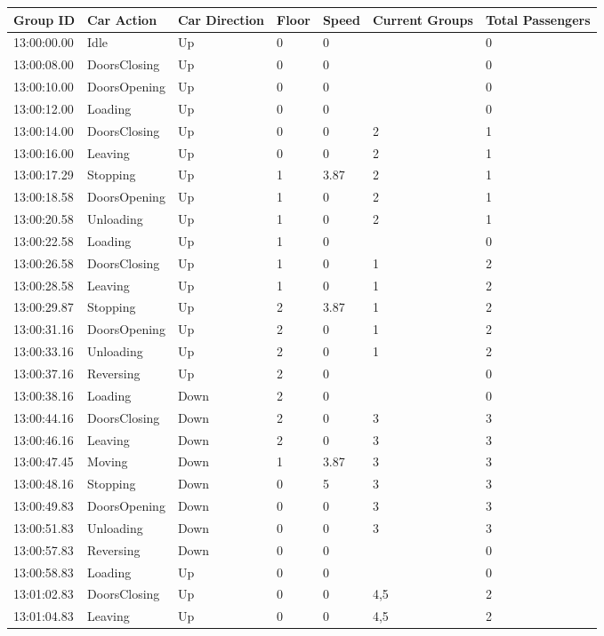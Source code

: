 \documentclass{UoYCSproject}
\begin{document}
\begin{appendices}
\begin{longtable}{l | l | l | l | l | l | l}
	Group ID & Car Action & Car Direction & Floor & Speed & Current Groups & Total Passengers \\
	\hline
	13:00:00.00 & Idle & Up & 0 & 0 &  & 0 \\
	13:00:08.00 & DoorsClosing & Up & 0 & 0 &  & 0 \\
	13:00:10.00 & DoorsOpening & Up & 0 & 0 &  & 0 \\
	13:00:12.00 & Loading & Up & 0 & 0 &  & 0 \\
	13:00:14.00 & DoorsClosing & Up & 0 & 0 & 2 & 1 \\
	13:00:16.00 & Leaving & Up & 0 & 0 & 2 & 1 \\
	13:00:17.29 & Stopping & Up & 1 & 3.87 & 2 & 1 \\
	13:00:18.58 & DoorsOpening & Up & 1 & 0 & 2 & 1 \\
	13:00:20.58 & Unloading & Up & 1 & 0 & 2 & 1 \\
	13:00:22.58 & Loading & Up & 1 & 0 &  & 0 \\
	13:00:26.58 & DoorsClosing & Up & 1 & 0 & 1 & 2 \\
	13:00:28.58 & Leaving & Up & 1 & 0 & 1 & 2 \\
	13:00:29.87 & Stopping & Up & 2 & 3.87 & 1 & 2 \\
	13:00:31.16 & DoorsOpening & Up & 2 & 0 & 1 & 2 \\
	13:00:33.16 & Unloading & Up & 2 & 0 & 1 & 2 \\
	13:00:37.16 & Reversing & Up & 2 & 0 &  & 0 \\
	13:00:38.16 & Loading & Down & 2 & 0 &  & 0 \\
	13:00:44.16 & DoorsClosing & Down & 2 & 0 & 3 & 3 \\
	13:00:46.16 & Leaving & Down & 2 & 0 & 3 & 3 \\
	13:00:47.45 & Moving & Down & 1 & 3.87 & 3 & 3 \\
	13:00:48.16 & Stopping & Down & 0 & 5 & 3 & 3 \\
	13:00:49.83 & DoorsOpening & Down & 0 & 0 & 3 & 3 \\
	13:00:51.83 & Unloading & Down & 0 & 0 & 3 & 3 \\
	13:00:57.83 & Reversing & Down & 0 & 0 &  & 0 \\
	13:00:58.83 & Loading & Up & 0 & 0 &  & 0 \\
	13:01:02.83 & DoorsClosing & Up & 0 & 0 & 4,5 & 2 \\
	13:01:04.83 & Leaving & Up & 0 & 0 & 4,5 & 2 \\

\end{longtable}
\end{appendices}
\end{document}
